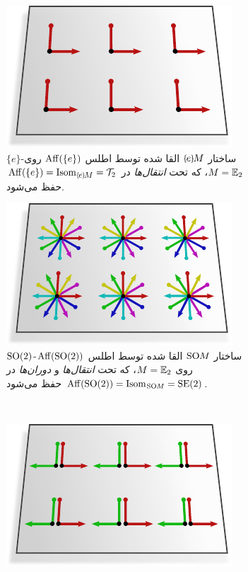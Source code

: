 \begin{figure}
	\centering
	\begin{subfigure}[b]{0.46\textwidth}
		\centering
		\includegraphics[width=.7\textwidth]{figures/G_structure_R2_1.pdf}
		\captionsetup{format=hang}
		\caption{\small
			$\{e\}$-ساختار $\eM$ القا شده توسط اطلس $\operatorname{Aff}(\{e\})$ روی ${M=\mathbb{E}_2}$، که تحت \emph{انتقال‌ها} در $\Aff(\{e\}) = \IsomeM = \Trans_2$ حفظ می‌شود.
		}
		\label{fig:G_structure_R2_1}
	\end{subfigure}
	\hfill
	\begin{subfigure}[b]{0.46\textwidth}
		\centering
		\includegraphics[width=.7\textwidth]{figures/G_structure_R2_2.pdf}
		\captionsetup{format=hang}
		\caption{\small
			$\operatorname{SO}(2)$-ساختار $\operatorname{SO}\mkern-3.6muM$ القا شده توسط اطلس $\operatorname{Aff}(\operatorname{SO}(2))$ روی $M=\mathbb{E}_2$، که تحت \emph{انتقال‌ها} و \emph{دوران‌ها} در $\operatorname{Aff}(\operatorname{SO}(2)) = \operatorname{Isom}_{\mkern1mu\operatorname{SO}\mkern-3.6muM} = \operatorname{SE}(2)$ حفظ می‌شود.
		}
		\label{fig:G_structure_R2_2}
	\end{subfigure}
	\\[3ex]
	\begin{subfigure}[b]{0.46\textwidth}
		\centering
		\includegraphics[width=.7\textwidth]{figures/G_structure_R2_3.pdf}

\end{subfigure}
\end{figure}
